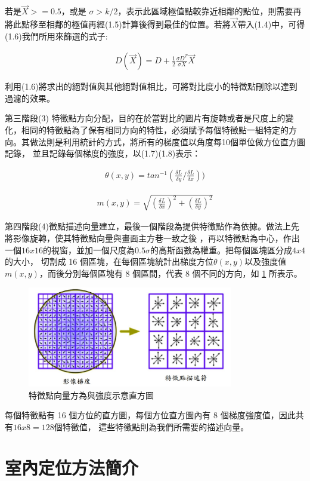    
   若是$\vec{X} >= 0.5$，或是 $\sigma > k/2$，表示此區域極值點較靠近相鄰的點位，則需要再將此點移至相鄰的極值再經(1.5)計算後得到最佳的位置。若將$\vec{X}$帶入(1.4)中，可得(1.6)我們所用來篩選的式子:
   
\begin{align}
  D(\vec{X}) = D+\frac{1}{2} \frac{\sigma D^T}{\sigma X} \vec{X}
\end{align}      
   
   利用(1.6)將求出的絕對值與其他絕對值相比，可將對比度小的特徵點刪除以達到過濾的效果。
   
   第三階段(3) 特徵點方向分配，目的在於當對比的圖片有旋轉或者是尺度上的變化，相同的特徵點為了保有相同方向的特性，必須賦予每個特徵點一組特定的方向。其做法則是利用統計的方式，將所有的梯度值以角度每10個單位做方位直方圖記錄，
並且記錄每個梯度的強度，以(1.7)(1.8)表示：

\begin{align}
	\theta (x,y)= tan^{-1}(\frac{\delta L}{\delta y}/\frac{\delta L}{\delta x}))
\end{align}      
   
\begin{align}
	m(x,y) = \sqrt{(\frac{\delta L}{\delta x})^2+(\frac{\delta L}{\delta y})^2}
\end{align}


   第四階段(4)徵點描述向量建立，最後一個階段為提供特徵點作為依據。做法上先將影像旋轉，使其特徵點向量與畫面主方巷一致之後
   ，再以特徵點為中心，作出一個$16 x 16$的視窗，並加一個尺度為$0.5\sigma$的高斯函數為權重。把每個區塊區分成$4 x 4$的大小，
   切割成 16 個區塊，在每個區塊統計出梯度方位$ \theta (x,y)$以及強度值$m(x,y)$，而後分別每個區塊有 8 個區間，代表 8 
   個不同的方向，如 \ref{fig:SIFT Histogram} 所表示。

\begin{figure}
\begin{center}
  \includegraphics[width=0.8\textwidth]{figures/SIFT_histogram.jpg}
  \caption{特徵點向量方為與強度示意直方圖}
  \label{fig:SIFT Histogram}
\end{center}
\end{figure}  

     每個特徵點有 16 個方位的直方圖，每個方位直方圖內有 8 個梯度強度值，因此共有$ 16 x 8 = 128$個特徵值，
     這些特徵點則為我們所需要的描述向量。

\section{室內定位方法簡介}



